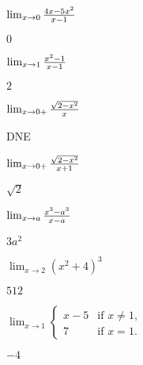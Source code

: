 \begin{exercises}
\begin{exercise} $\lim _{x\to 0 } {4x - 5x^2\over x-1}$
\begin{answer} $0$
\end{answer}\end{exercise}

\begin{exercise} $\lim _{x\to 1 } {x^2 -1 \over x-1 }$
\begin{answer} $2$
\end{answer}\end{exercise}

\begin{exercise} $\lim _{x\to 0 + } {\sqrt{2-x^2 }\over x}$
\begin{answer} DNE
\end{answer}\end{exercise}

\begin{exercise} $\lim _{x\to 0 + } {\sqrt{2-x^2}\over x+1}$
\begin{answer} $\sqrt2$
\end{answer}\end{exercise}

\begin{exercise} $\lim _{x\to a } {x^3 -a^3\over x-a}$
\begin{answer} $3a^2$
\end{answer}\end{exercise}

\begin{exercise} $\lim _{x\to 2 } (x^2 +4)^3$
\begin{answer} $512$
\end{answer}\end{exercise}

\begin{exercise} $\lim _{x\to 1 } \begin{cases}
x-5 & \text{if $x\ne 1$}, \\
7 & \text{if $x=1$}. \end{cases}$
\begin{answer} $-4$
\end{answer}\end{exercise}

\endtwocol

\end{exercises}



